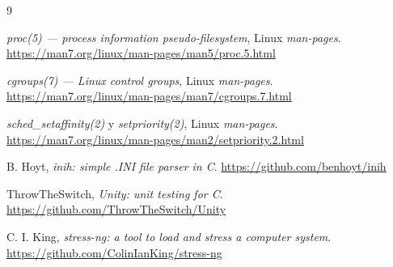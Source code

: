 \documentclass[conference]{IEEEtran}
\begin{document}
\begin{thebibliography}{9}

\textit{proc(5) — process information pseudo-filesystem}, Linux \emph{man-pages}.
\url{https://man7.org/linux/man-pages/man5/proc.5.html}

\textit{cgroups(7) — Linux control groups}, Linux \emph{man-pages}.
\url{https://man7.org/linux/man-pages/man7/cgroups.7.html}

\textit{sched\_setaffinity(2)} y \textit{setpriority(2)}, Linux \emph{man-pages}.
\url{https://man7.org/linux/man-pages/man2/setpriority.2.html}

B. Hoyt, \textit{inih: simple .INI file parser in C}.
\url{https://github.com/benhoyt/inih}

ThrowTheSwitch, \textit{Unity: unit testing for C}.
\url{https://github.com/ThrowTheSwitch/Unity}

C. I. King, \textit{stress-ng: a tool to load and stress a computer system}.
\url{https://github.com/ColinIanKing/stress-ng}

\end{thebibliography}
\end{document}
